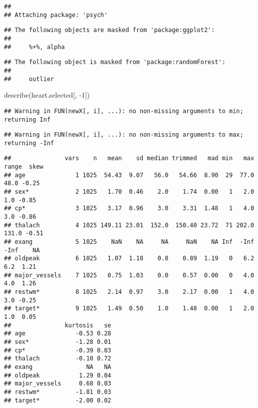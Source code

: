 \documentclass[
]{article}
\newenvironment{Shaded}{\begin{snugshade}}{\end{snugshade}}
\newcommand{\DecValTok}[1]{\textcolor[rgb]{0.00,0.00,0.81}{#1}}
\newcommand{\FunctionTok}[1]{\textcolor[rgb]{0.00,0.00,0.00}{#1}}
\newcommand{\NormalTok}[1]{#1}
\newcommand{\SpecialCharTok}[1]{\textcolor[rgb]{0.00,0.00,0.00}{#1}}
\begin{document}
\begin{verbatim}
## 
## Attaching package: 'psych'
\end{verbatim}

\begin{verbatim}
## The following objects are masked from 'package:ggplot2':
## 
##     %+%, alpha
\end{verbatim}

\begin{verbatim}
## The following object is masked from 'package:randomForest':
## 
##     outlier
\end{verbatim}

\begin{Shaded}
\begin{Highlighting}[]
\FunctionTok{describe}\NormalTok{(heart.selected[, }\SpecialCharTok{{-}}\DecValTok{1}\NormalTok{])}
\end{Highlighting}
\end{Shaded}

\begin{verbatim}
## Warning in FUN(newX[, i], ...): no non-missing arguments to min; returning Inf
\end{verbatim}

\begin{verbatim}
## Warning in FUN(newX[, i], ...): no non-missing arguments to max; returning -Inf
\end{verbatim}

\begin{verbatim}
##               vars    n   mean    sd median trimmed   mad min   max range  skew
## age              1 1025  54.43  9.07   56.0   54.66  8.90  29  77.0  48.0 -0.25
## sex*             2 1025   1.70  0.46    2.0    1.74  0.00   1   2.0   1.0 -0.85
## cp*              3 1025   3.17  0.96    3.0    3.31  1.48   1   4.0   3.0 -0.86
## thalach          4 1025 149.11 23.01  152.0  150.40 23.72  71 202.0 131.0 -0.51
## exang            5 1025    NaN    NA     NA     NaN    NA Inf  -Inf  -Inf    NA
## oldpeak          6 1025   1.07  1.18    0.8    0.89  1.19   0   6.2   6.2  1.21
## major_vessels    7 1025   0.75  1.03    0.0    0.57  0.00   0   4.0   4.0  1.26
## restwm*          8 1025   2.14  0.97    3.0    2.17  0.00   1   4.0   3.0 -0.25
## target*          9 1025   1.49  0.50    1.0    1.48  0.00   1   2.0   1.0  0.05
##               kurtosis   se
## age              -0.53 0.28
## sex*             -1.28 0.01
## cp*              -0.39 0.03
## thalach          -0.10 0.72
## exang               NA   NA
## oldpeak           1.29 0.04
## major_vessels     0.68 0.03
## restwm*          -1.81 0.03
## target*          -2.00 0.02
\end{verbatim}
\end{document}
